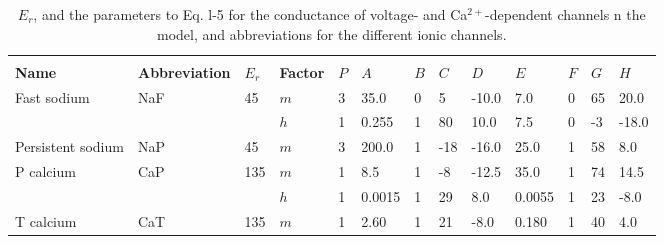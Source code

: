 \documentclass[12pt]{article}
\begin{document}
\begin{table}[h]
\caption{$E_r$, and the parameters to Eq. l-5 for the conductance of voltage- and Ca$^{2+}$-dependent channels n the model, and abbreviations for the different ionic channels.}        
\begin{tabular}{ l l l l l l l l l l l l l }
                                             &                                                                         &              &                       &         &                                                      &        &          &           &                &         &          &             \\
   {\bf Name}                        & {\bf Abbreviation}                                         & {$E_r$} & {\bf Factor} & $P$ & $A$                                             & $B$ & $C$ & $D$   & $E$       & $F$ & $G$  & $H$   \\
   Fast sodium                     & NaF                                                                & 45          & $m$             & 3      & 35.0                                            & 0      & 5       & -10.0 & 7.0         & 0     & 65     & 20.0   \\
                                              &                                                                         &               & $h$              & 1      & 0.255                                          & 1      & 80     & 10.0  & 7.5         & 0     & -3      & -18.0  \\
   Persistent sodium          & NaP                                                                & 45          & $m$             & 3      & 200.0                                          & 1      & -18    & -16.0 & 25.0      & 1     & 58     & 8.0      \\
   P calcium                         & CaP                                                                & 135       & $m$             & 1      & 8.5                                               & 1      & -8      & -12.5 & 35.0      & 1     & 74     & 14.5    \\
                                              &                                                                         &               & $h$              & 1      & 0.0015                                        & 1      & 29     & 8.0    & 0.0055  & 1     & 23     & -8.0    \\
   T calcium                         & CaT                                                                 & 135      & $m$              & 1      & 2.60                                             & 1      & 21    & -8.0   & 0.180     & 1     & 40     & 4.0     \\

\end{tabular}
\end{table}
\end{document}
